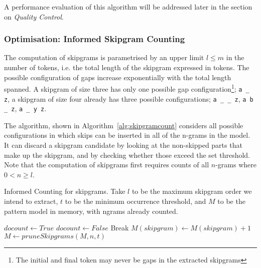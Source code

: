 \documentclass[a4paper,12pt]{article}
\begin{document}
A performance evaluation of this algorithm will be addressed later in the
section on \emph{Quality Control}.

\subsubsection{Optimisation: Informed Skipgram Counting}
\label{sec:skipgramcount}

The computation of skipgrams is parametrised by an upper limit $l\leq m$ in the number of
tokens, i.e. the total length of the skipgram expressed in tokens. The possible configuration of gaps increase exponentially with the
total length spanned. A skipgram of size three has only one possible
gap configuration\footnote{The initial and final token may never be gaps in the extracted skipgrams};
\texttt{a \_ z}, a skipgram of size four already has three possible configurations;
\texttt{a \_ \_ z}, \texttt{a b \_ z}, \texttt{a \_ y z}.

The algorithm, shown in Algorithm~\ref{alg:skipgramcount} considers all
possible configurations in which skips can be inserted in all of the n-grams in the model. It can
discard a skipgram candidate by looking at the non-skipped parts that make up
the skipgram, and by checking whether those exceed the set threshold. Note that
the computation of skipgrams first requires counts of all $n$-grams where
$0<n\geq l$. 

\begin{algorithm} \caption{Informed Counting for skipgrams.  Take $l$
to be the maximum skipgram order we intend to extract, $t$ to be the minimum occurrence threshold, and $M$ to be the
pattern model in memory, with ngrams already counted.}
\label{alg:skipgramcount}
\begin{algorithmic}
            \State $docount \leftarrow True$
                    \State $docount \leftarrow False$
                    Break
                \EndIf
            \EndFor 
                \State $M(skipgram) \leftarrow M(skipgram) + 1$
            \EndIf
            \EndFor 
            \EndFor
    \State $M \leftarrow pruneSkipgrams(M,n,t)$
\EndFor \\
\end{algorithmic}
\end{algorithm}
\end{document}
